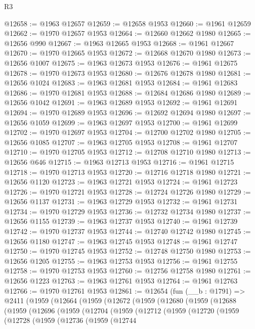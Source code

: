 \begin{lexlean}{R3}
\begin{coremodule}
@12658 := @1963 @12657
@12659 := @12658 @1953
@12660 := @1961 @12659
@12662 := @1970 @12657 @1953
@12664 := @12660 @12662 @1980
@12665 := @12656 @990
@12667 := @1963 @12665 @1953
@12668 := @1961 @12667
@12670 := @1970 @12665 @1953
@12672 := @12668 @12670 @1980
@12673 := @12656 @1007
@12675 := @1963 @12673 @1953
@12676 := @1961 @12675
@12678 := @1970 @12673 @1953
@12680 := @12676 @12678 @1980
@12681 := @12656 @1024
@12683 := @1963 @12681 @1953
@12684 := @1961 @12683
@12686 := @1970 @12681 @1953
@12688 := @12684 @12686 @1980
@12689 := @12656 @1042
@12691 := @1963 @12689 @1953
@12692 := @1961 @12691
@12694 := @1970 @12689 @1953
@12696 := @12692 @12694 @1980
@12697 := @12656 @1059
@12699 := @1963 @12697 @1953
@12700 := @1961 @12699
@12702 := @1970 @12697 @1953
@12704 := @12700 @12702 @1980
@12705 := @12656 @1085
@12707 := @1963 @12705 @1953
@12708 := @1961 @12707
@12710 := @1970 @12705 @1953
@12712 := @12708 @12710 @1980
@12713 := @12656 @646
@12715 := @1963 @12713 @1953
@12716 := @1961 @12715
@12718 := @1970 @12713 @1953
@12720 := @12716 @12718 @1980
@12721 := @12656 @1120
@12723 := @1963 @12721 @1953
@12724 := @1961 @12723
@12726 := @1970 @12721 @1953
@12728 := @12724 @12726 @1980
@12729 := @12656 @1137
@12731 := @1963 @12729 @1953
@12732 := @1961 @12731
@12734 := @1970 @12729 @1953
@12736 := @12732 @12734 @1980
@12737 := @12656 @1155
@12739 := @1963 @12737 @1953
@12740 := @1961 @12739
@12742 := @1970 @12737 @1953
@12744 := @12740 @12742 @1980
@12745 := @12656 @1180
@12747 := @1963 @12745 @1953
@12748 := @1961 @12747
@12750 := @1970 @12745 @1953
@12752 := @12748 @12750 @1980
@12753 := @12656 @1205
@12755 := @1963 @12753 @1953
@12756 := @1961 @12755
@12758 := @1970 @12753 @1953
@12760 := @12756 @12758 @1980
@12761 := @12656 @1223
@12763 := @1963 @12761 @1953
@12764 := @1961 @12763
@12766 := @1970 @12761 @1953
@12861 := @12654
    (fun (__b : @1791) =>
    @2411
      (@1959
        (@12664
          (@1959
            (@12672
              (@1959
                (@12680
                  (@1959
                    (@12688
                      (@1959
                        (@12696
                          (@1959
                            (@12704
                              (@1959
                                (@12712
                                  (@1959
                                    (@12720
                                      (@1959
                                        (@12728
                                          (@1959
                                            (@12736
                                              (@1959
                                                (@12744

\end{coremodule}
\end{lexlean}
